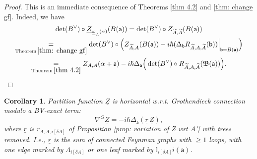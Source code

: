 \documentclass[11pt,a4paper]{amsart}
\theoremstyle{plain} %
\newtheorem{cor}[thm]{Corollary}
\theoremstyle{definition}
\theoremstyle{remark}
\newcommand{\mr}{\mathrm}
\newcommand{\sfa}{\mathsf{a}}
\newcommand{\sfb}{\mathsf{b}}
\newcommand{\til}{\widetilde}
\newcommand{\ul}{\underline}
\begin{document}
\begin{proof}
This is an immediate consequence of Theorems \ref{thm 4.2} and \ref{thm: change gf}.
Indeed, we have
\begin{multline}
 \det(B^\vee)\circ \underline{Z}_{\underline{\varphi}_{A}(\alpha)} (B(\sfa))=\det(B^\vee)\circ Z_{\til{A},\til{A}}(B(\sfa))
\\ 
\underset{\mr{Theorem\,}\ref{thm: change gf}}{=}
\det(B^\vee)\circ \Big( Z_{\til{A},A}(B(\sfa))-i\hbar (\Delta_\sfb R_{\til{A},A,\til{A}}(\sfb))\Big|_{\sfb=B(\sfa)} \Big)\\
\underset{\mr{Theorem\,}\ref{thm 4.2}}{=}
Z_{A,A}(\alpha+\sfa)-i\hbar \Delta_\sfa \Big(\det(B^\vee)\circ R_{\til{A},A,\til{A}}(\mathfrak{B}(\sfa))\Big).
\end{multline}
\end{proof}

\begin{cor}\label{cor ulZ nabla^G horizontality}
    Partition function $\ul{Z}$ is horizontal w.r.t. Grothendieck connection modulo a BV-exact term:
    \begin{equation}\label{Z underline almost-horizontality}
        \nabla^G \ul{Z}=-i\hbar\Delta_\sfa 
        (\ul{r}\, \ul{Z}),
    \end{equation}
    where $\ul{r}$ is $r_{A,A;i[\delta A]}$ of Proposition \ref{prop: variation of Z wrt A'} with trees removed. I.e., $\ul{r}$ is the sum of connected Feynman graphs with $\geq 1$ loops, with one edge marked by $\Lambda_{i[\delta A]}$ or one leaf marked by $\mathbb{I}_{i[\delta A]}i(\sfa)$.
\end{cor}
\end{document}
